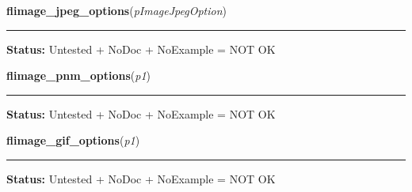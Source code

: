     \vspace{0.5ex}

\hspace{.8\funcindent}\begin{boxedminipage}{\funcwidth}

    \raggedright \textbf{flimage\_jpeg\_options}(\textit{pImageJpegOption})

    \vspace{-1.5ex}

    \rule{\textwidth}{0.5\fboxrule}
\setlength{\parskip}{2ex}
\setlength{\parskip}{1ex}
\textbf{Status:} Untested + NoDoc + NoExample = NOT OK



    \end{boxedminipage}

    \label{xformslib:library:flimage_pnm_output_options}

    \vspace{0.5ex}

\hspace{.8\funcindent}\begin{boxedminipage}{\funcwidth}

    \raggedright \textbf{flimage\_pnm\_options}(\textit{p1})

    \vspace{-1.5ex}

    \rule{\textwidth}{0.5\fboxrule}
\setlength{\parskip}{2ex}
\setlength{\parskip}{1ex}
\textbf{Status:} Untested + NoDoc + NoExample = NOT OK



    \end{boxedminipage}

    \label{xformslib:library:flimage_gif_output_options}

    \vspace{0.5ex}

\hspace{.8\funcindent}\begin{boxedminipage}{\funcwidth}

    \raggedright \textbf{flimage\_gif\_options}(\textit{p1})

    \vspace{-1.5ex}

    \rule{\textwidth}{0.5\fboxrule}
\setlength{\parskip}{2ex}
\setlength{\parskip}{1ex}
\textbf{Status:} Untested + NoDoc + NoExample = NOT OK



    \end{boxedminipage}

